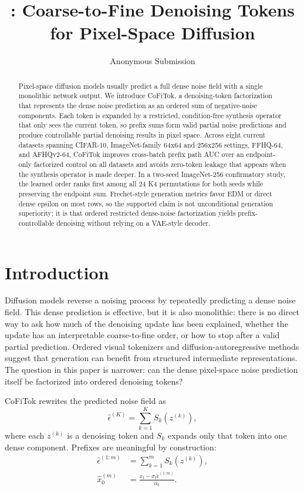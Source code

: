 \documentclass[letterpaper]{article}
\title{\method: Coarse-to-Fine Denoising Tokens for Pixel-Space Diffusion}
\author{Anonymous Submission}
\newcommand{\method}{CoFiTok}
\newcommand{\epshat}{\hat{\epsilon}}
\newcommand{\xt}{x_t}
\begin{document}
\maketitle

\begin{abstract}
Pixel-space diffusion models usually predict a full dense noise field with a
single monolithic network output. We introduce \method, a denoising-token
factorization that represents the dense noise prediction as an ordered sum of
negative-noise components. Each token is expanded by a restricted,
condition-free synthesis operator that only sees the current token, so prefix
sums form valid partial noise predictions and produce controllable partial
denoising results in pixel space. Across eight current datasets spanning
CIFAR-10, ImageNet-family 64x64 and 256x256 settings, FFHQ-64, and AFHQv2-64,
\method{} improves cross-batch prefix path AUC over an endpoint-only factorized control
on all datasets and avoids zero-token leakage that appears when the synthesis
operator is made deeper. In a two-seed ImageNet-256 confirmatory study, the
learned order ranks first among all 24 K4 permutations for both seeds while
preserving the endpoint sum. Frechet-style generation metrics favor EDM or direct dense
epsilon on most rows, so the supported claim is not unconditional generation
superiority; it is that ordered restricted dense-noise factorization yields
prefix-controllable denoising without relying on a VAE-style decoder.
\end{abstract}

\section{Introduction}

Diffusion models reverse a noising process by repeatedly predicting a dense
noise field. This dense prediction is effective, but it is also monolithic:
there is no direct way to ask how much of the denoising update has been
explained, whether the update has an interpretable coarse-to-fine order, or how
to stop after a valid partial prediction. Ordered visual tokenizers and
diffusion-autoregressive methods suggest that generation can benefit from
structured intermediate representations. The question in this paper is
narrower: can the dense pixel-space noise prediction itself be factorized into
ordered denoising tokens?

\method{} rewrites the predicted noise field as
\begin{equation}
  \epshat^{(K)} = \sum_{k=1}^{K} S_k\left(z^{(k)}\right),
  \label{eq:full-factorization}
\end{equation}
where each $z^{(k)}$ is a denoising token and $S_k$ expands only
that token into one dense component. Prefixes are meaningful by construction:
\begin{align}
  \epshat^{(1:m)} &= \sum_{k=1}^{m} S_k\left(z^{(k)}\right), \\
  \hat{x}^{(m)}_0 &= \frac{\xt - \sigma_t \epshat^{(1:m)}}{\alpha_t}.
  \label{eq:prefix-denoise}
\end{align}
\end{document}
